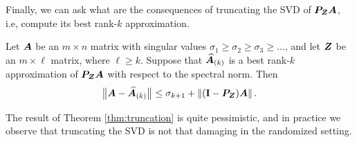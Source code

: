 Finally, we can ask what are the consequences of truncating the SVD
of $\bm{P}_{\bm{Z}}\bm{A}$, i.e, compute its best rank-$k$ approximation.
\begin{theorem} \label{thm:truncation}
Let $\bm{A}$ be an $m \times n$ matrix with singular values $\sigma_1 \geq \sigma_2 \geq \sigma_3 \geq \dots$,
and let $\bm{Z}$ be an $m \times \ell$ matrix, where $\ell \geq k$.
Suppose that $\widehat{\bm{A}}_{(k)}$ is a best rank-$k$ approximation of $\bm{P}_{\bm{Z}} \bm{A}$ with respect to the spectral norm.  Then
$$
{\bigl\Vert { \bm{A} - \widehat{\bm{A}}_{(k)} } \bigr\Vert}_{}
  \leq \sigma_{k+1} + \left\Vert {(\mathbf{I}- \bm{P}_{\bm{Z}}) \bm{A}} \right\Vert.
$$
\end{theorem}
\begin{remark} \rm
The result of Theorem \ref{thm:truncation} is quite pessimistic, and
in practice we observe that truncating the SVD is not that damaging in
the randomized setting.
\end{remark}


